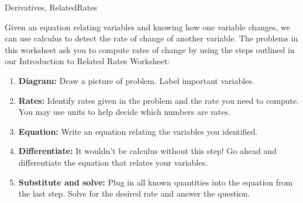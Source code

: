 

	
\begin{tagblock}{Derivatives, RelatedRates}
\begin{question}
	

Given an equation relating variables and knowing how one variable changes, we can use calculus to detect the rate of change of another variable. The problems in this worksheet ask you to compute rates of change by using the steps outlined in our Introduction to Related Rates Worksheet: 
\begin{enumerate}
\item {\bf Diagram: }Draw a picture of problem. Label important variables.
\item {\bf Rates:} Identify rates given in the problem and the rate you need to compute. You may use units to help decide which numbers are rates.
\item {\bf Equation:} Write an equation relating the variables you identified.
\item {\bf Differentiate:} It wouldn't be calculus without this step! Go ahead and differentiate the equation that relates your variables.
\item {\bf Substitute and solve:} Plug in all known quantities into the equation from the last step. Solve for the desired rate and answer the question.
\end{enumerate}

\bigskip




\end{question}
\end{tagblock}
